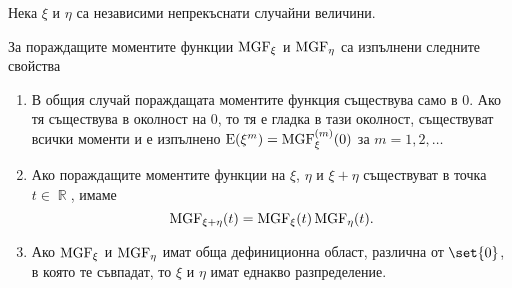 \documentclass{../../common/topic}
\begin{document}
\begin{theorem}\label{thm:mgf_properties}
  Нека \( \xi \) и \( \eta \) са независими непрекъснати случайни величини.

  За пораждащите моментите функции \( \operatorname{MGF}_\xi \) и \( \operatorname{MGF}_\eta \) са изпълнени следните свойства
  \begin{enumerate}
    \item В общия случай пораждащата моментите функция съществува само в \( 0 \). Ако тя съществува в околност на \( 0 \), то тя е гладка в тази околност, съществуват всички моменти и е изпълнено \( \operatorname{E}(\xi^m) = \operatorname{MGF}_\xi^{(m)} (0) \) за \( m = 1, 2, \ldots \)

    \item Ако пораждащите моментите функции на \( \xi \), \( \eta \) и \( \xi + \eta \) съществуват в точка \( t \in \BbbR \), имаме
    \begin{equation*}
      \operatorname{MGF}_{\xi + \eta}(t) = \operatorname{MGF}_\xi(t) \operatorname{MGF}_\eta(t).
    \end{equation*}

    \item Ако \( \operatorname{MGF}_\xi \) и \( \operatorname{MGF}_\eta \) имат обща дефиниционна област, различна от \( \set{ 0 } \), в която те съвпадат, то \( \xi \) и \( \eta \) имат еднакво разпределение.
  \end{enumerate}
\end{theorem}
\end{document}
